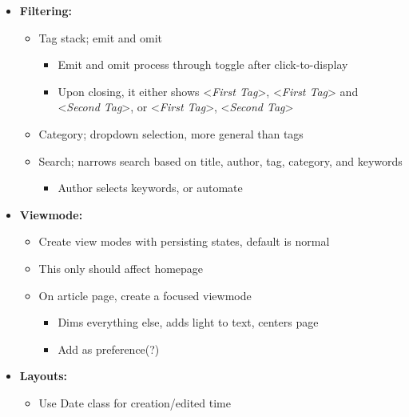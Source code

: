 \documentclass{article}
\begin{document}
{
  \begin{itemize}[label=\textsection]
    \item \textbf{Filtering:}
      \small
      \begin{itemize}[label=$\multimapdotinv$, leftmargin=3mm]
        \item Tag stack; emit and omit
          \begin{itemize}[label=\wr, leftmargin=1.7mm]
            \item Emit and omit process through toggle after click-to-display
            \item Upon closing, it either shows <\textsl{First Tag}>, <\textsl{First Tag}> and <\textsl{Second Tag}>, or <\textsl{First Tag}>, <\textsl{Second Tag}>\textellipsis
          \end{itemize}
        \item Category; dropdown selection, more general than tags
        \item Search; narrows search based on title, author, tag, category, and keywords
          \begin{itemize}[label=\wr, leftmargin=1.7mm]
            \item Author selects keywords, or automate
          \end{itemize}
      \end{itemize}
      \normalsize
    \item \textbf{Viewmode:}
      \small 
      \begin{itemize}[label=$\multimapdotinv$, leftmargin=3mm]
        \item Create view modes with persisting states, default is normal 
        \item This only should affect homepage
        \item On article page, create a focused viewmode
          \begin{itemize}[label=\wr, leftmargin=1.7mm]
            \item Dims everything else, adds light to text, centers page
            \item Add as preference(?)
          \end{itemize}
      \end{itemize}
      \normalsize
    \item \textbf{Layouts: }
      \small
      \begin{itemize}[label=$\multimapdotinv$, leftmargin=3mm]
        \item Use Date class for creation/edited time

\end{itemize}
\end{itemize}}
\end{document}
